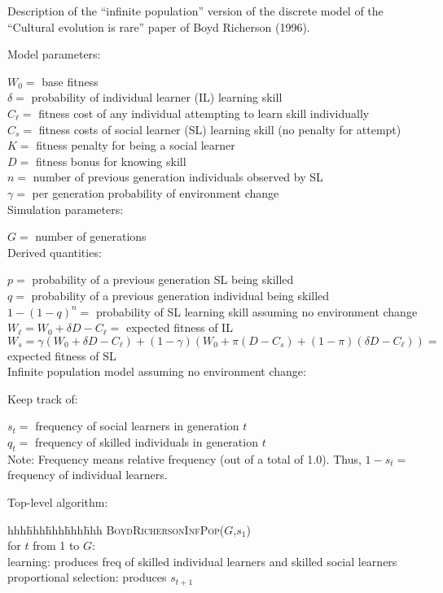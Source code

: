 \documentclass[11pt]{article}
\begin{document}
Description of the ``infinite population'' version of the discrete model of the 
``Cultural evolution is rare'' paper of Boyd Richerson (1996).

Model parameters:

$W_0 = $ base fitness \\
$\delta = $ probability of individual learner (IL) learning skill\\
$C_\ell = $ fitness cost of any individual attempting to learn skill individually\\
$C_s = $ fitness costs of social learner (SL) learning skill (no penalty for attempt)\\
$K = $ fitness penalty for being a social learner\\
$D = $ fitness bonus for knowing skill\\
$n = $ number of previous generation individuals observed by SL\\
$\gamma = $ per generation probability of environment change\\

Simulation parameters:

$G = $ number of generations\\

Derived quantities:

$p = $ probability of a previous generation SL being skilled\\
$q = $ probability of a previous generation individual being skilled\\
$1-(1-q)^n = $ probability of SL learning skill assuming no environment change\\
$W_\ell = W_0 + \delta D - C_\ell = $ expected fitness of IL \\
$W_s = \gamma(W_0+\delta D - C_\ell) + (1-\gamma)(W_0+\pi(D-C_s)+(1-\pi)(\delta D-C_\ell))
 = $ expected fitness of SL \\

Infinite population model assuming no environment change:

Keep track of:  

$s_t = $ frequency of social learners in generation $t$\\
$q_t = $ frequency of skilled individuals in generation $t$\\

Note:  Frequency means relative frequency (out of a total of 1.0).
Thus, $1-s_t = $ frequency of individual learners.

Top-level algorithm:

\begin{tabbing}
hhh\=hhh\=hhh\=hhh\=hhh\kill
\textsc{ BoydRichersonInfPop}($G$,$s_1$)\\
\>for $t$ from 1 to $G$:\\
\>\>learning: produces freq of skilled individual learners and skilled social learners\\
\>\>proportional selection: produces $s_{t+1}$\\
\end{tabbing}
\end{document}
